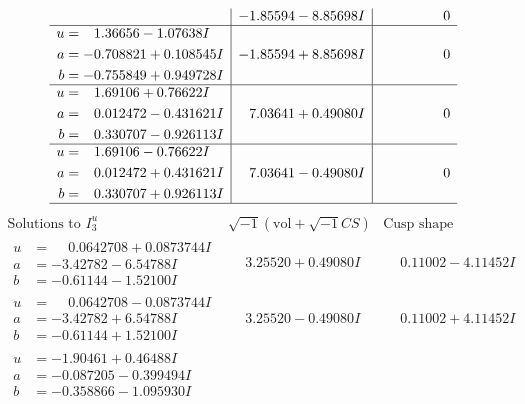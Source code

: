 \documentclass[1p]{elsarticle_modified}
\theoremstyle{definition}
\newcommand{\I}{\sqrt{-1}}
\begin{document}
$$\begin{array}{c|c|c}
 & -1.85594 - 8.85698 I & \phantom{-0.000000 } 0 \\ \hline\begin{aligned}
u &= \phantom{-}1.36656 - 1.07638 I \\
a &= -0.708821 + 0.108545 I \\
b &= -0.755849 + 0.949728 I\end{aligned}
 & -1.85594 + 8.85698 I & \phantom{-0.000000 } 0 \\ \hline\begin{aligned}
u &= \phantom{-}1.69106 + 0.76622 I \\
a &= \phantom{-}0.012472 - 0.431621 I \\
b &= \phantom{-}0.330707 - 0.926113 I\end{aligned}
 & \phantom{-}7.03641 + 0.49080 I & \phantom{-0.000000 } 0 \\ \hline\begin{aligned}
u &= \phantom{-}1.69106 - 0.76622 I \\
a &= \phantom{-}0.012472 + 0.431621 I \\
b &= \phantom{-}0.330707 + 0.926113 I\end{aligned}
 & \phantom{-}7.03641 - 0.49080 I & \phantom{-0.000000 } 0\\
 \hline 
 \end{array}$$\newpage$$\begin{array}{c|c|c}  
\text{Solutions to }I^u_{3}& \I (\text{vol} + \sqrt{-1}CS) & \text{Cusp shape}\\
 \hline 
\begin{aligned}
u &= \phantom{-}0.0642708 + 0.0873744 I \\
a &= -3.42782 - 6.54788 I \\
b &= -0.61144 - 1.52100 I\end{aligned}
 & \phantom{-}3.25520 + 0.49080 I & \phantom{-}0.11002 - 4.11452 I \\ \hline\begin{aligned}
u &= \phantom{-}0.0642708 - 0.0873744 I \\
a &= -3.42782 + 6.54788 I \\
b &= -0.61144 + 1.52100 I\end{aligned}
 & \phantom{-}3.25520 - 0.49080 I & \phantom{-}0.11002 + 4.11452 I \\ \hline\begin{aligned}
u &= -1.90461 + 0.46488 I \\
a &= -0.087205 - 0.399494 I \\
b &= -0.358866 - 1.095930 I\end{aligned}

\end{array}$$
\end{document}
